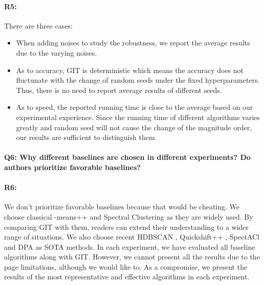 \documentclass[letterpaper]{article} \usepackage{aaai22}  \usepackage{times}  \usepackage{helvet}  \usepackage{courier}  \usepackage[hyphens]{url}  \usepackage{graphicx} \urlstyle{rm} \def\UrlFont{\rm}  \usepackage{natbib}  \usepackage{caption} \DeclareCaptionStyle{ruled}{labelfont=normalfont,labelsep=colon,strut=off} \frenchspacing  \setlength{\pdfpagewidth}{8.5in}  \setlength{\pdfpageheight}{11in}  \usepackage{subfigure}
\begin{document}
\paragraph{R5:} There are three cases:
\begin{itemize}[itemindent=1em]
    \item When adding noises to study the robustness, we report the average results due to the varying noises.
    \item As to accuracy, GIT is deterministic which means the accuracy does not fluctunate with the change of random seeds under the fixed hyperparameters. Thus, there is no need to report average results of different seeds.
    \item As to speed, the reported running time is close to the average based on our experimental experience. Since the running time of different algorithms varies greatly and random seed will not cause the change of the magnitude order, our results are sufficient to distinguish them.
\end{itemize}



\paragraph{Q6: Why different baselines are chosen in different experiments? Do authors prioritize favorable baselines?}

\paragraph{R6:} We don't prioritize favorable baselines because that would be cheating. We choose classical -means++ and Spectral Clustering as they are widely used. By comparing GIT with them, readers can extend their understanding to a wider range of situations. We also choose recent HDBSCAN \cite{mcinnes2017accelerated}, Quickshift++ \cite{jiang2018quickshift++}, SpectACl \cite{hess2019spectacl} and DPA \cite{d2021automatic} as SOTA methods. In each experiment, we have evaluated all baseline algorithms along with GIT. However, we cannot present all the results due to the page limitations, although we would like to. As a compromise, we present the results of the most representative and effective algorithms in each experiment.
\end{document}
